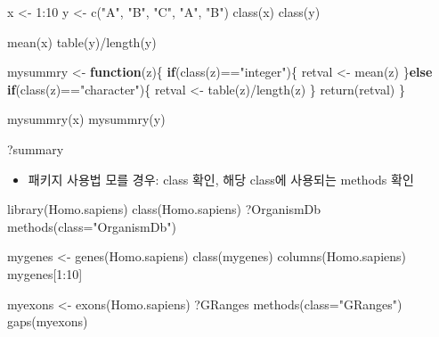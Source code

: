 \documentclass[
]{book}
\newenvironment{Shaded}{\begin{snugshade}}{\end{snugshade}}
\newcommand{\AttributeTok}[1]{\textcolor[rgb]{0.77,0.63,0.00}{#1}}
\newcommand{\ControlFlowTok}[1]{\textcolor[rgb]{0.13,0.29,0.53}{\textbf{#1}}}
\newcommand{\DecValTok}[1]{\textcolor[rgb]{0.00,0.00,0.81}{#1}}
\newcommand{\FunctionTok}[1]{\textcolor[rgb]{0.00,0.00,0.00}{#1}}
\newcommand{\NormalTok}[1]{#1}
\newcommand{\OtherTok}[1]{\textcolor[rgb]{0.56,0.35,0.01}{#1}}
\newcommand{\SpecialCharTok}[1]{\textcolor[rgb]{0.00,0.00,0.00}{#1}}
\newcommand{\StringTok}[1]{\textcolor[rgb]{0.31,0.60,0.02}{#1}}
\providecommand{\tightlist}{%
  \setlength{\itemsep}{0pt}\setlength{\parskip}{0pt}}
\begin{document}
\begin{Shaded}
\begin{Highlighting}[]

\NormalTok{x }\OtherTok{\textless{}{-}} \DecValTok{1}\SpecialCharTok{:}\DecValTok{10}
\NormalTok{y }\OtherTok{\textless{}{-}} \FunctionTok{c}\NormalTok{(}\StringTok{"A"}\NormalTok{, }\StringTok{"B"}\NormalTok{, }\StringTok{"C"}\NormalTok{, }\StringTok{"A"}\NormalTok{, }\StringTok{"B"}\NormalTok{)}
\FunctionTok{class}\NormalTok{(x)}
\FunctionTok{class}\NormalTok{(y)}

\FunctionTok{mean}\NormalTok{(x)}
\FunctionTok{table}\NormalTok{(y)}\SpecialCharTok{/}\FunctionTok{length}\NormalTok{(y)}

\NormalTok{mysummry }\OtherTok{\textless{}{-}} \ControlFlowTok{function}\NormalTok{(z)\{}
  \ControlFlowTok{if}\NormalTok{(}\FunctionTok{class}\NormalTok{(z)}\SpecialCharTok{==}\StringTok{"integer"}\NormalTok{)\{}
\NormalTok{    retval }\OtherTok{\textless{}{-}} \FunctionTok{mean}\NormalTok{(z)}
\NormalTok{  \}}\ControlFlowTok{else} \ControlFlowTok{if}\NormalTok{(}\FunctionTok{class}\NormalTok{(z)}\SpecialCharTok{==}\StringTok{"character"}\NormalTok{)\{}
\NormalTok{    retval }\OtherTok{\textless{}{-}} \FunctionTok{table}\NormalTok{(z)}\SpecialCharTok{/}\FunctionTok{length}\NormalTok{(z)}
\NormalTok{  \}}
  \FunctionTok{return}\NormalTok{(retval)}
\NormalTok{\}}


\FunctionTok{mysummry}\NormalTok{(x)}
\FunctionTok{mysummry}\NormalTok{(y)}

\NormalTok{?summary}
\end{Highlighting}
\end{Shaded}

\begin{itemize}
\tightlist
\item
  패키지 사용법 모를 경우: class 확인, 해당 class에 사용되는 methods 확인
\end{itemize}

\begin{Shaded}
\begin{Highlighting}[]

\FunctionTok{library}\NormalTok{(Homo.sapiens)}
\FunctionTok{class}\NormalTok{(Homo.sapiens)}
\NormalTok{?OrganismDb}
\FunctionTok{methods}\NormalTok{(}\AttributeTok{class=}\StringTok{"OrganismDb"}\NormalTok{)}

\NormalTok{mygenes }\OtherTok{\textless{}{-}} \FunctionTok{genes}\NormalTok{(Homo.sapiens)}
\FunctionTok{class}\NormalTok{(mygenes)}
\FunctionTok{columns}\NormalTok{(Homo.sapiens)}
\NormalTok{mygenes[}\DecValTok{1}\SpecialCharTok{:}\DecValTok{10}\NormalTok{]}

\NormalTok{myexons }\OtherTok{\textless{}{-}} \FunctionTok{exons}\NormalTok{(Homo.sapiens)}
\NormalTok{?GRanges}
\FunctionTok{methods}\NormalTok{(}\AttributeTok{class=}\StringTok{"GRanges"}\NormalTok{)}
\FunctionTok{gaps}\NormalTok{(myexons)}
\end{Highlighting}
\end{Shaded}
\end{document}
